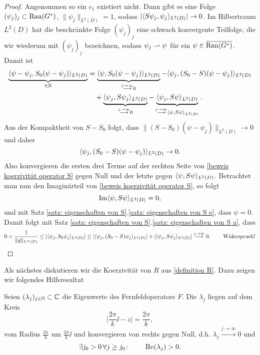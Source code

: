 \begin{proof}
	Angenommen so ein \(c_1\) existiert nicht. Dann gibt es eine Folge \((\psi_j)_j\subset\operatorname{Ran}(G^\ast)\), \(\|\psi_j\|_{L^2(D)}=1\), sodass \(|\langle S\psi_j,\psi_j\rangle_{L^2(D)}|\to0\). Im Hilbertraum \(L^2(D)\) hat die beschränkte Folge \((\psi_j)_j\) eine schwach konvergente Teilfolge, die wir wiederum mit \((\psi_j)_j\) bezeichnen, sodass \(\psi_j\rightharpoonup\psi\) für ein \(\psi\in\overline{\operatorname{Ran}(G^\ast)}\). Damit ist
	\begin{equation}
		\label{beweis koerzivität operator S}
		\begin{aligned}
			\underbrace{\langle \psi-\psi_j,S_0(\psi-\psi_j)\rangle_{L^2(D)}}_{\in\mathbb{R}}
			&=
			\underbrace{\langle \psi,S_0(\psi-\psi_j)\rangle_{L^2(D)}}_{\overset{j\to\infty}{\longrightarrow}0}
			-
			\langle \psi_j,(S_0-S)(\psi-\psi_j)\rangle_{L^2(D)}\\
			&\quad+
			\underbrace{\langle \psi_j,S\psi_j\rangle_{L^2(D)}}_{\overset{j\to\infty}{\longrightarrow}0}
			-
			\underbrace{\langle \psi_j,S\psi\rangle_{L^2(D)}}_{\overset{j\to\infty}{\longrightarrow}\langle \psi,S\psi\rangle_{L^2(D)}}.
		\end{aligned}
	\end{equation}
	Aus der Kompaktheit von \(S-S_0\) folgt, dass \(\|(S-S_0)(\psi-\psi_j)\|_{L^2(D)}\to0\) und daher
	\begin{equation*}
		\langle \psi_j,(S_0-S)(\psi-\psi_j)\rangle_{L^2(D)}\to0.
	\end{equation*}
	Also konvergieren die ersten drei Terme auf der rechten Seite von \eqref{beweis koerzivität operator S} gegen Null und der letzte gegen \(\langle \psi,S\psi\rangle_{L^2(D)}\). Betrachtet man nun den Imaginärteil von \eqref{beweis koerzivität operator S}, so folgt
	\begin{equation*}
		\operatorname{Im}\langle \psi,S\psi\rangle_{L^2(D)}=0,
	\end{equation*}
	und mit Satz \ref{satz: eigenschaften von S}.\ref{satz: eigenschaften von S e}, dass \(\psi=0\). Damit folgt mit Satz \ref{satz: eigenschaften von S}.\ref{satz: eigenschaften von S a}, dass
	\begin{equation*}
		0<\frac{1}{\|q\|_{L^\infty(D)}}
		\leq
		|\langle \psi_j,S_0\psi_j\rangle_{L^2(D)}|
		\leq
		|\langle \psi_j,(S_0-S)\psi_j\rangle_{L^2(D)}| + |\langle \psi_j,S\psi_j\rangle_{L^2(D)}|\overset{j\to\infty}{\longrightarrow}0.\qquad\text{ Widerspruch!}
	\end{equation*}
\end{proof}
Als nächstes diskutieren wir die Koerzivität von \(R\) aus \eqref{definition R}. Dazu zeigen wir folgendes Hilfsresultat
\begin{lem}\label{lem: hilfsresultat für koerzivität von R}
	Seien \((\lambda_j)_{j\in\mathbb{N}}\subset\mathbb{C}\) die Eigenwerte des Fernfeldoperators \(F\). Die \(\lambda_j\) liegen auf dem Kreis
	\begin{equation*}
		\Big|\frac{2\pi}{k}\ii-z\Big| = \frac{2\pi}{k},
	\end{equation*}
	vom Radius \(\frac{2\pi}{k}\) um \(\frac{2\pi}{k}\ii\) und konvergieren von rechts gegen Null, d.h. \(\lambda_j\overset{j\to\infty}{\longrightarrow}0\) und 
	\begin{equation*}
		\exists j_0>0\,\forall j\geq j_0\colon\qquad\operatorname{Re}(\lambda_j)>0.
	\end{equation*}
\end{lem}
